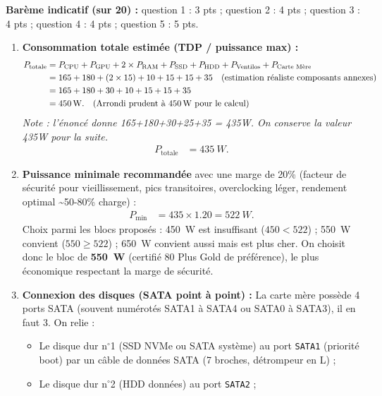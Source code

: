 \documentclass[11pt]{article}
\begin{document}
\begin{corrige}
\textbf{Barème indicatif (sur 20) :} question 1 : 3 pts ; question 2 : 4 pts ; question 3 : 4 pts ; question 4 : 4 pts ; question 5 : 5 pts.
\begin{enumerate}
  \item \textbf{Consommation totale estimée (TDP / puissance max) :}
  \begin{align*}
  P_{\text{totale}} &= P_{\text{CPU}} + P_{\text{GPU}} + 2\times P_{\text{RAM}} + P_{\text{SSD}} + P_{\text{HDD}} + P_{\text{Ventilos}} + P_{\text{Carte Mère}} \\
  &= 165 + 180 + (2 \times 15) + 10 + 15 + 15 + 35 \quad \text{(estimation réaliste composants annexes)} \\
  &= 165 + 180 + 30 + 10 + 15 + 15 + 35 \\
  &= \SI{450}{W}. \quad \text{(Arrondi prudent à \SI{450}{W} pour le calcul)}
  \end{align*}
  \textit{Note : l'énoncé donne 165+180+30+25+35 = 435W. On conserve la valeur 435W pour la suite.}
  \begin{align*}
  P_{\text{totale}} &= \SI{435}{W}.
  \end{align*}
  \item \textbf{Puissance minimale recommandée} avec une marge de 20\% (facteur de sécurité pour vieillissement, pics transitoires, overclocking léger, rendement optimal \textasciitilde 50-80\% charge) :
  \begin{align*}
  P_{\text{min}} &= 435 \times 1.20 = \SI{522}{W}.
  \end{align*}
  Choix parmi les blocs proposés : \SI{450}{W} est insuffisant ($450 < 522$) ; \SI{550}{W} convient ($550 \geq 522$) ; \SI{650}{W} convient aussi mais est plus cher. On choisit donc le bloc de \textbf{\SI{550}{W}} (certifié 80 Plus Gold de préférence), le plus économique respectant la marge de sécurité.
  \item \textbf{Connexion des disques (SATA point à point) :} La carte mère possède 4 ports SATA (souvent numérotés SATA1 à SATA4 ou SATA0 à SATA3), il en faut 3. On relie :
  \begin{itemize}
    \item Le disque dur n$^{\circ}$1 (SSD NVMe ou SATA système) au port \texttt{SATA1} (priorité boot) par un câble de données SATA (7 broches, détrompeur en L) ;
    \item Le disque dur n$^{\circ}$2 (HDD données) au port \texttt{SATA2} ;

\end{itemize}
\end{enumerate}
\end{corrige}
\end{document}
